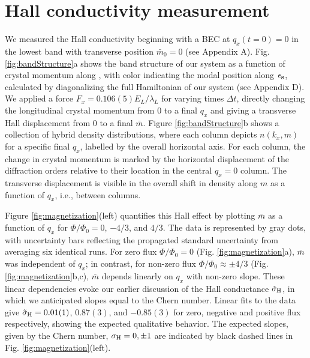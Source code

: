 \section{Hall conductivity measurement}

	We measured the Hall conductivity beginning with a BEC at $q_x(t=0)=0$ in the lowest band with transverse position $\bar{m}_0=0$ (see Appendix A).  Fig. \ref{fig:bandStructure}a shows the band structure of our system as a function of crystal momentum along \ex, with color indicating the modal position along $\bf{\mathit{e}_s}$, calculated by diagonalizing the full Hamiltonian of our system (see Appendix D). We applied a force $F_x=0.106(5) E_L/\lambda_L$ for varying times $\Delta t$, directly changing the longitudinal crystal momentum from $0$ to a final $q_x$ and giving a transverse Hall displacement from $0$ to a final $\bar{m}$. Figure \ref{fig:bandStructure}b shows a collection of hybrid density distributions, where each column depicts $n(k_x,m)$ for a specific final $q_x$, labelled by the overall horizontal axis. For each column, the change in crystal momentum is marked by the horizontal displacement of the diffraction orders relative to their location in the central $q_x=0$ column. The transverse displacement is visible in the overall shift in density along $m$ as a function of $q_x$, i.e., between columns.  

	Figure \ref{fig:magnetization}(left) quantifies this Hall effect by plotting $\bar{m}$ as a function of $q_x$ for $\Phi/\Phi_0=0$, $-4/3$, and $4/3$. The data is represented by gray dots, with uncertainty bars reflecting the propagated standard uncertainty from averaging six identical runs. For zero flux $\Phi/\Phi_0=0$ (Fig. \ref{fig:magnetization}a), $\bar{m}$ was independent of $q_x$; in contrast, for non-zero flux $\Phi/\Phi_0\approx\pm4/3$  (Fig. \ref{fig:magnetization}b,c),  $\bar{m}$ depends linearly on $q_x$ with non-zero slope. These linear dependencies evoke our earlier discussion of the Hall conductance $\tilde{\sigma}_{\rm{H}}$, in which we anticipated slopes equal to the Chern number. Linear fits to the data give $\tilde{\sigma}_{\rm{H}}=0.01(1)$, $0.87(3)$, and $-0.85(3)$ for zero, negative and positive flux respectively, showing the expected qualitative behavior. The expected slopes, given by the Chern number, $\sigma_{\rm{H}}=0,\pm1$ are indicated by black dashed lines in Fig. \ref{fig:magnetization}(left). 


